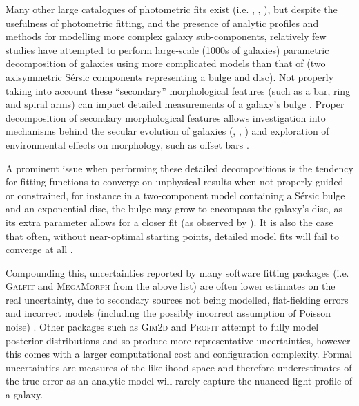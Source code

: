 \documentclass[trackchanges]{aastex63}
\begin{document}
Many other large catalogues of photometric fits exist (i.e. \citealt{2012MNRAS.421.2277L}, \citealt{2012MNRAS.421.1007K}, \citealt{2012ApJS..203...24V}), but despite the usefulness of photometric fitting, and the presence of analytic profiles and methods for modelling more complex galaxy sub-components, relatively few studies have attempted to perform large-scale (1000s of galaxies) parametric decomposition of galaxies using more complicated models than that of \citet{2011ApJS..196...11S} (two axisymmetric S\'ersic components representing a bulge and disc). Not properly taking into account these ``secondary'' morphological features (such as a bar, ring and spiral arms) can impact detailed measurements of a galaxy's bulge \citep{Gao2017:1709.00746v1}. Proper decomposition of secondary morphological features allows investigation into mechanisms behind the secular evolution of galaxies (\citealt{2015MNRAS.453.3729H}, \citealt{2018MNRAS.473.4731K}, \citealt{2018ApJ...862..100G}) and exploration of environmental effects on morphology, such as offset bars \citep{2017MNRAS.469.3363K}.

A prominent issue when performing these detailed decompositions is the tendency for fitting functions to converge on unphysical results when not properly guided or constrained, for instance in a two-component model containing a S\'ersic bulge and an exponential disc, the bulge may grow to encompass the galaxy's disc, as its extra parameter allows for a closer fit (as observed by \citealt{2018MNRAS.473.4731K}). It is also the case that often, without near-optimal starting points, detailed model fits will fail to converge at all \citep{2016MNRAS.462.1470L}.

Compounding this, uncertainties reported by many software fitting packages (i.e. \textsc{Galfit} and \textsc{MegaMorph} from the above list) are often lower estimates on the real uncertainty, due to secondary sources not being modelled, flat-fielding errors and incorrect models (including the possibly incorrect assumption of Poisson noise) \citep{2010AJ....139.2097P}. Other packages such as \textsc{Gim2d} and \textsc{Profit} attempt to fully model posterior distributions and so produce more representative uncertainties, however this comes with a larger computational cost and configuration complexity. Formal uncertainties are measures of the likelihood space and therefore underestimates of the true error as an analytic model will rarely capture the nuanced light profile of a galaxy.
\end{document}
